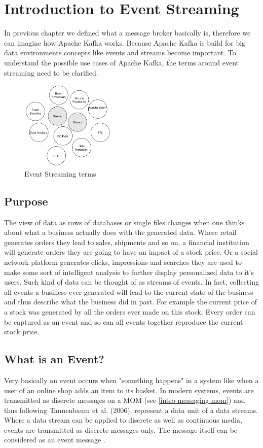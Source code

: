\chapter{Introduction to Event Streaming}

In previous chapter we defined what a message broker basically is, therefore we
can imagine how Apache Kafka works. Because Apache Kafka is build for big data
environments  concepts like events and streams become
important. To understand the possible use cases of Apache Kafka, the terms
around event streaming need to be clarified. 

\begin{figure}[H]
    \centering
    \includegraphics[width=0.4\textwidth]{images/evenstreaming-intro.png}
    \caption{Event Streaming terms}
    \label{fig:evenstreaming-intro}
\end{figure}

\section{Purpose}
The view of data as rows of databases or single files changes when one thinks
about what a business actually does with the generated data. Where retail
generates orders they lead to sales, shipments and so on, a financial
institution will generate orders they are going to have an impact of a stock
price. Or a social network platform generates clicks, impressions and searches
they are used to make some sort of intelligent analysis to further display
personalized data to it's users. Such kind of data can be thought of as streams
of events. In fact, collecting all events a business ever generated will lead to
the current state of the business and thus describe what the business did in
past. For example the current price of a stock was generated by all the orders
ever made on this stock. Every order can be captured as an event and so can all
events together reproduce the current stock price.

\section{What is an Event?}
\label{intro-datastream-datastream}
Very basically an event occurs when "something happens"  in a system like when a
user of an online shop adds an item to its basket. In modern systems, events are
transmitted as discrete messages on a MOM (see \ref{intro-messaging-mom}) and
thus following Tannenbaum et al. (2006), represent a data unit of a data
streams. Where a data stream can be applied to discrete as well as continuous
media, events are transmitted as discrete messages only. The message itself
can be considered as an event message \cite{EIP03}.

